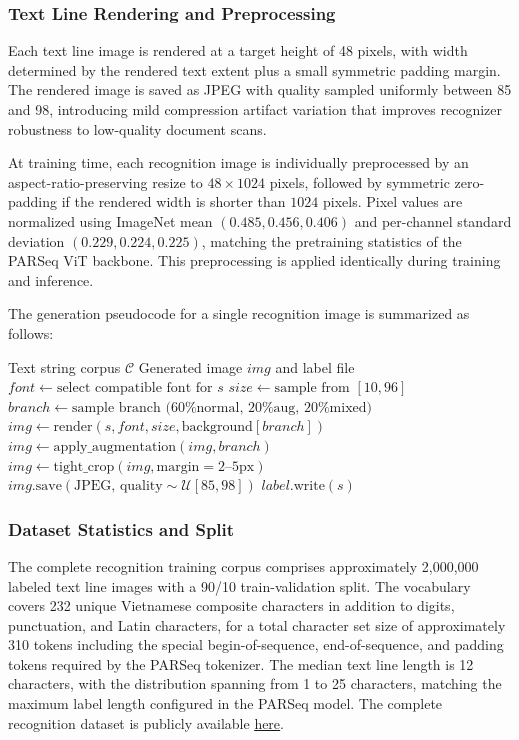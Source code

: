 \subsubsection{Text Line Rendering and Preprocessing}
Each text line image is rendered at a target height of 48 pixels, with width determined by the rendered text extent plus a small symmetric padding margin. The rendered image is saved as JPEG with quality sampled uniformly between 85 and 98, introducing mild compression artifact variation that improves recognizer robustness to low-quality document scans.

At training time, each recognition image is individually preprocessed by an aspect-ratio-preserving resize to $48 \times 1024$ pixels, followed by symmetric zero-padding if the rendered width is shorter than $1024$ pixels. Pixel values are normalized using ImageNet mean $(0.485, 0.456, 0.406)$ and per-channel standard deviation $(0.229, 0.224, 0.225)$, matching the pretraining statistics of the PARSeq ViT backbone. This preprocessing is applied identically during training and inference.

The generation pseudocode for a single recognition image is summarized as follows:
\begin{algorithm}[H]
\footnotesize
\caption{Data Generation Pipeline for a Single Recognition Image}
\label{alg:data_generation}
\begin{algorithmic}[1]
\Require Text string corpus $\mathcal{C}$
\Ensure Generated image $img$ and label file
    \State $font \gets \text{select compatible font for } s$
    \State $size \gets \text{sample from } [10, 96]$
    \State $branch \gets \text{sample branch (60\% normal, 20\% aug, 20\% mixed)}$
    \State $img \gets \text{render}(s, font, size, \text{background}[branch])$
    \State $img \gets \text{apply\_augmentation}(img, branch)$
    \State $img \gets \text{tight\_crop}(img, \text{margin}=2\text{--}5\text{px})$
    \State $img.\text{save}(\text{JPEG, quality} \sim \mathcal{U}[85, 98])$
    \State $label.\text{write}(s)$
\EndFor
\end{algorithmic}
\end{algorithm}

\subsubsection{Dataset Statistics and Split}
The complete recognition training corpus comprises approximately 2,000,000 labeled text line images with a 90/10 train-validation split. The vocabulary covers 232 unique Vietnamese composite characters in addition to digits, punctuation, and Latin characters, for a total character set size of approximately 310 tokens including the special begin-of-sequence, end-of-sequence, and padding tokens required by the PARSeq tokenizer. The median text line length is 12 characters, with the distribution spanning from 1 to 25 characters, matching the maximum label length configured in the PARSeq model. The complete recognition dataset is publicly available \href{https://drive.google.com/drive/folders/1k3GEfYtW_D61z3JAUfHinRIHWLU2HdkD?usp=sharing}{\underline{here}}.
